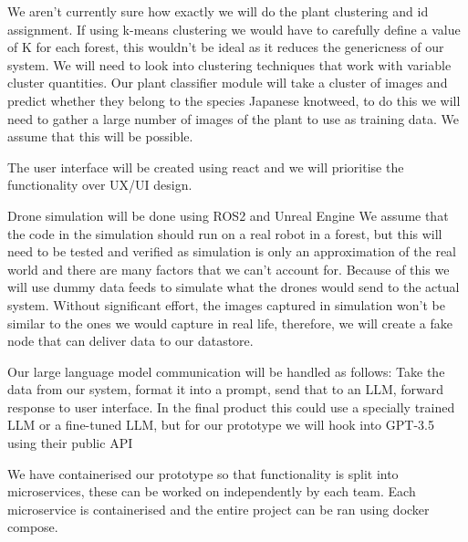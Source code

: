 \documentclass{article}
\begin{document}
We aren't currently sure how exactly we will do the plant clustering and id assignment.
If using k-means clustering we would have to carefully define a value of K for each forest, this wouldn't be ideal as it reduces the genericness of our system.
We will need to look into clustering techniques that work with variable cluster quantities.
Our plant classifier module will take a cluster of images and predict whether they belong to the species Japanese knotweed, to do this we will need to gather a large number of images of the plant to use as training data. We assume that this will be possible. %

The user interface will be created using react and we will prioritise the functionality over UX/UI design. 

Drone simulation will be done using ROS2 and Unreal Engine %
We assume that the code in the simulation should run on a real robot in a forest, but this will need to be tested and verified as simulation is only an approximation of the real world and there are many factors that we can't account for.
Because of this we will use dummy data feeds to simulate what the drones would send to the actual system.
Without significant effort, the images captured in simulation won't be similar to the ones we would capture in real life, therefore, we will create a fake node that can deliver data to our datastore.

Our large language model communication will be handled as follows: Take the data from our system, format it into a prompt, send that to an LLM, forward response to user interface.
In the final product this could use a specially trained LLM or a fine-tuned LLM, but for our prototype we will hook into GPT-3.5 using their public API %

We have containerised our prototype so that functionality is split into microservices, these can be worked on independently by each team.
Each microservice is containerised and the entire project can be ran using docker compose.

\end{document}
